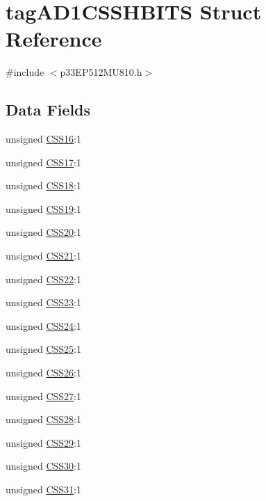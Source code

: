 \hypertarget{structtag_a_d1_c_s_s_h_b_i_t_s}{}\section{tag\+A\+D1\+C\+S\+S\+H\+B\+I\+TS Struct Reference}
\label{structtag_a_d1_c_s_s_h_b_i_t_s}


{\ttfamily \#include $<$p33\+E\+P512\+M\+U810.\+h$>$}

\subsection*{Data Fields}
\begin{DoxyCompactItemize}
\item 
unsigned \hyperlink{structtag_a_d1_c_s_s_h_b_i_t_s_ace85198fc6bf43beb8d28eb8c80a9ef9}{C\+S\+S16}\+:1
\item 
unsigned \hyperlink{structtag_a_d1_c_s_s_h_b_i_t_s_a759389b6665aaf16e42c41d479d7a2b3}{C\+S\+S17}\+:1
\item 
unsigned \hyperlink{structtag_a_d1_c_s_s_h_b_i_t_s_a8c7ae494f4ad03f536572745e808b402}{C\+S\+S18}\+:1
\item 
unsigned \hyperlink{structtag_a_d1_c_s_s_h_b_i_t_s_a4258b854be48594b9863820a5c5d6607}{C\+S\+S19}\+:1
\item 
unsigned \hyperlink{structtag_a_d1_c_s_s_h_b_i_t_s_a6559f9e54d9ee7c947d02d63a64fbe57}{C\+S\+S20}\+:1
\item 
unsigned \hyperlink{structtag_a_d1_c_s_s_h_b_i_t_s_a98280ad3588930fcb7dd18f884e1af07}{C\+S\+S21}\+:1
\item 
unsigned \hyperlink{structtag_a_d1_c_s_s_h_b_i_t_s_aa6643b73f50df90dab71c4278b0eb53f}{C\+S\+S22}\+:1
\item 
unsigned \hyperlink{structtag_a_d1_c_s_s_h_b_i_t_s_ae7e09aaff405db0ab49bf8e9cddf7e0a}{C\+S\+S23}\+:1
\item 
unsigned \hyperlink{structtag_a_d1_c_s_s_h_b_i_t_s_a179594fd85a0024675d34825b096e673}{C\+S\+S24}\+:1
\item 
unsigned \hyperlink{structtag_a_d1_c_s_s_h_b_i_t_s_a23d4f62cc0a980ee2d9fa1110338c65a}{C\+S\+S25}\+:1
\item 
unsigned \hyperlink{structtag_a_d1_c_s_s_h_b_i_t_s_a3aa55caf4abfc1b2814cbbaf8459c987}{C\+S\+S26}\+:1
\item 
unsigned \hyperlink{structtag_a_d1_c_s_s_h_b_i_t_s_afc1104cf8851403e902862934bc22f8c}{C\+S\+S27}\+:1
\item 
unsigned \hyperlink{structtag_a_d1_c_s_s_h_b_i_t_s_a210b59c143b5a6dbe259330a5b019745}{C\+S\+S28}\+:1
\item 
unsigned \hyperlink{structtag_a_d1_c_s_s_h_b_i_t_s_af9e7066e43c670bf8a1be161f0e315da}{C\+S\+S29}\+:1
\item 
unsigned \hyperlink{structtag_a_d1_c_s_s_h_b_i_t_s_a361b68bd74d71746af4c98eae8e3d16a}{C\+S\+S30}\+:1
\item 
unsigned \hyperlink{structtag_a_d1_c_s_s_h_b_i_t_s_a29d0589107c10e2aa85c6c753f95c11c}{C\+S\+S31}\+:1
\end{DoxyCompactItemize}


